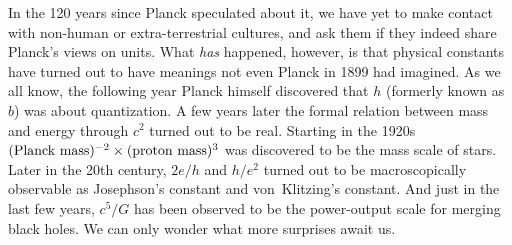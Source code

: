 \documentclass[aps,prb,12pt]{revtex4-1}
\begin{document}
In the 120 years since Planck speculated about it, we have yet to make
contact with non-human or extra-terrestrial cultures, and ask them if
they indeed share Planck's views on units.  What {\em has} happened,
however, is that physical constants have turned out to have meanings
not even Planck in 1899 had imagined.  As we all know, the following
year Planck himself discovered that $h$ (formerly known as $b$) was
about quantization.  A few years later the formal relation between
mass and energy through $c^2$ turned out to be real.  Starting in the
1920s $(\hbox{Planck mass})^{-2}\times(\hbox{proton mass})^3$ was
discovered to be the mass scale of stars.  Later in the 20th century,
$2e/h$ and $h/e^2$ turned out to be macroscopically observable as
Josephson's constant and von~Klitzing's constant.  And just in the
last few years, $c^5/G$ has been observed to be the power-output scale
for merging black holes.  We can only wonder what more surprises await
us.

\def\aj{AJ}
\def\apjl{ApJL}
\def\aap{A\&A}
\def\mnras{MNRAS}
\def\pasp{PASP}



\end{document}
